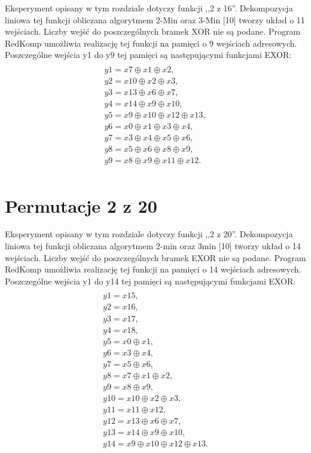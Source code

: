 Eksperyment opisany w tym rozdziale dotyczy funkcji ,,2 z 16''.
Dekompozycja liniowa tej funkcji obliczana algorytmem 2-Min oraz 3-Min [10] tworzy układ o 11 wejściach.
Liczby wejść do poszczególnych bramek XOR nie są podane.
Program RedKomp umożliwia realizację tej funkcji na pamięci o 9 wejściach adresowych.
Poszczególne wejścia y1 do y9 tej pamięci są następującymi funkcjami EXOR:
\begin{multline} \\
y1 = x7 \oplus x1 \oplus x2, \\
y2 = x10 \oplus x2 \oplus x3, \\
y3 = x13 \oplus x6 \oplus x7, \\
y4 = x14 \oplus x9 \oplus x10, \\
y5 = x9 \oplus x10 \oplus x12 \oplus x13, \\
y6 = x0 \oplus x1 \oplus x3 \oplus x4, \\
y7 = x3 \oplus x4 \oplus x5 \oplus x6, \\
y8 = x5 \oplus x6 \oplus x8 \oplus x9, \\
y9 = x8 \oplus x9 \oplus x11 \oplus x12. \\
\end{multline}

\section{Permutacje 2 z 20}

Eksperyment opisany w tym rozdziale dotyczy funkcji ,,2 z 20''.
Dekompozycja liniowa tej funkcji obliczana algorytmem 2-min oraz 3min [10] tworzy układ o 14 wejściach.
Liczby wejść do poszczególnych bramek EXOR nie są podane.
Program RedKomp umożliwia realizację tej funkcji na pamięci o 14 wejściach adresowych.
Poszczególne wejścia y1 do y14 tej pamięci są następującymi funkcjami EXOR:
\begin{multline} \\
y1 = x15, \\
y2 = x16, \\
y3 = x17, \\
y4 = x18, \\
y5 = x0 \oplus x1, \\
y6 = x3 \oplus x4, \\
y7 = x5 \oplus x6, \\
y8 = x7 \oplus x1 \oplus x2, \\
y9 = x8 \oplus x9, \\
y10 = x10 \oplus x2 \oplus x3, \\
y11 = x11 \oplus x12, \\
y12 = x13 \oplus x6 \oplus x7, \\
y13 = x14 \oplus x9 \oplus x10, \\
y14 = x9 \oplus x10 \oplus x12 \oplus x13. \\
\end{multline}

